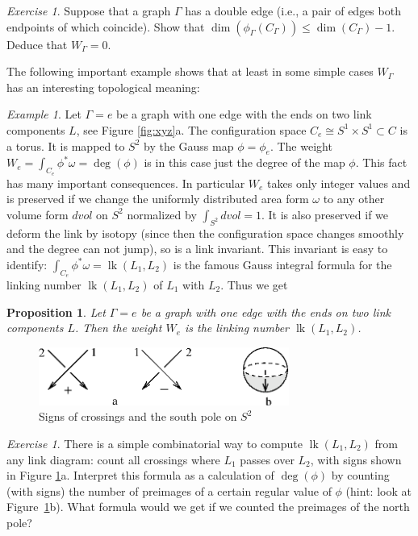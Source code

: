 \documentclass[10pt]{amsart}
\newtheorem{prop}[thm]{Proposition}
\theoremstyle{definition}
\theoremstyle{remark}
\newtheorem{ex}[thm]{Example}
\newtheorem{exs}[thm]{Exercise}
\newcommand{\dvol}{dvol}
\newcommand{\GG}{\Gamma}
\newcommand{\Go}{\omega}
\newcommand{\lk}{\operatorname{lk}}
\begin{document}
\begin{exs}\label{exs:double}
Suppose that a graph $\GG$ has a double edge (i.e., a pair of
edges both endpoints of which coincide). Show that
$\dim(\phi_\GG(C_\GG))\le\dim(C_\GG)-1$. Deduce that $W_\GG=0$.
\end{exs}

The following important example shows that at least in some simple
cases $W_\GG$ has an interesting topological meaning:

\begin{ex}\label{ex:link}
Let $\GG=e$ be a graph with one edge with the ends on two link
components $L$, see Figure \ref{fig:xyz}a. The configuration
space $C_e\cong S^1\times S^1\subset C$ is a torus. It is mapped
to $S^2$ by the Gauss map $\phi=\phi_e$. The weight $W_e=\int_{C_e}
\phi^*\Go=\deg(\phi)$ is in this case just the degree of the map
$\phi$. This fact has many important consequences. In particular
$W_e$ takes only integer values and is preserved if we change the
uniformly distributed area form $\Go$ to any other volume form
$\dvol$ on $S^2$ normalized by $\int_{S^2}\dvol=1$. It is also
preserved if we deform the link by isotopy (since then the
configuration space changes smoothly and the degree can not jump),
so is a link invariant. This invariant is easy to identify:
$\int_{C_e}\phi^*\Go=\lk(L_1,L_2)$ is the famous Gauss integral
formula for the linking number $\lk(L_1,L_2)$ of $L_1$ with $L_2$.
Thus we get
\begin{prop}
Let $\GG=e$ be a graph with one edge with the ends on two link
components $L$. Then the weight $W_e$ is the linking number
$\lk(L_1,L_2)$.
\end{prop}
\end{ex}

\begin{figure}[htb]
\includegraphics[height=0.75in]{signs.eps}
\caption{Signs of crossings and the south pole on $S^2$}
\label{fig:signs}
\end{figure}


\begin{exs}
There is a simple combinatorial way to compute $\lk(L_1,L_2)$
from any link diagram: count all crossings where $L_1$ passes
over $L_2$, with signs shown in Figure \ref{fig:signs}a.
Interpret this formula as a calculation of $\deg(\phi)$ by
counting (with signs) the number of preimages of a certain
regular value of $\phi$ (hint: look at Figure~\ref{fig:signs}b).
What formula would we get if we  counted the preimages
of the north pole?
\end{exs}
\end{document}
